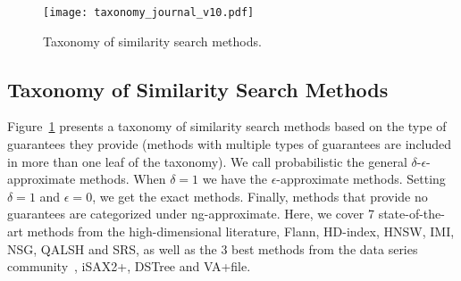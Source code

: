 \begin{figure}[tb]
	\centering
	\captionsetup{justification=centering}
	\texttt{[image: taxonomy\_journal\_v10.pdf]}
	\caption{{\color{black} Taxonomy of similarity search methods.}}
	\vspace*{-0.2cm}
	\label{fig:taxonomy}
\end{figure}






\subsection{Taxonomy of Similarity Search Methods}
Figure~\ref{fig:taxonomy} presents a taxonomy of similarity search methods based on the type of guarantees they provide (methods with multiple types of guarantees are included in more than one leaf of the taxonomy).
We call probabilistic the general $\delta$-$\epsilon$-approximate methods. 
When $\delta =1$ we have the $\epsilon$-approximate methods.
Setting $\delta=1$ and $\epsilon=0$, we get the exact methods. %
Finally, methods that provide no guarantees are categorized under ng-approximate. 
Here, {\color{black} we cover 7 state-of-the-art methods from the high-dimensional literature, Flann, HD-index, HNSW, IMI, NSG, QALSH and SRS, as well as the 3 best methods from the data series community~\cite{journal/pvldb/echihabi2018}, iSAX2+, DSTree and VA+file. %
}











